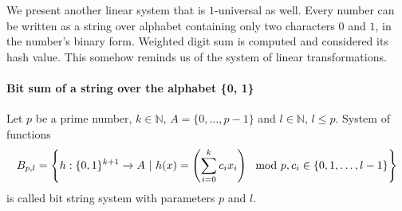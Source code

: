 We present another linear system that is $1$-universal as well. Every number can be written as a string over alphabet containing only two characters $0$ and $1$, in the number's binary form. Weighted digit sum is computed and considered its hash value. This somehow reminds us of the system of linear transformations.

\paragraph{Bit sum of a string over the alphabet \{0, 1\}}
\begin{definition}
Let $p$ be a prime number, $k \in \mathbb{N}$, $A = \{0, \dots, p - 1 \}$ and $l \in \mathbb{N}$, $l \leq p$. System of functions
\begin{displaymath}
B_{p, l} = \left\{ h: \{0, 1\}^{k + 1} \rightarrow A \ | \  h(x) = \left(\displaystyle \sum_{i=0}^{k} c_i x_i\right) \mod p, c_i \in \{0, 1, \dots, l - 1\} \right\}
\end{displaymath} 
is called bit string system with parameters $p$ and $l$.
\end{definition}

